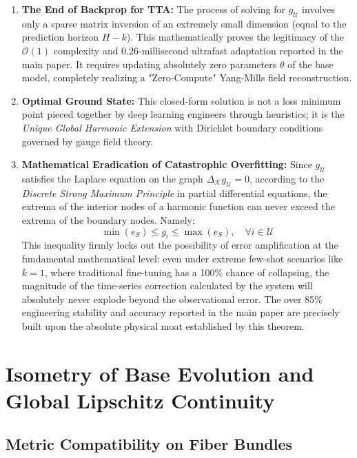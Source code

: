 \documentclass{article}
\begin{document}
\begin{enumerate}
    \item \textbf{The End of Backprop for TTA:} The process of solving for $g_{\mathcal{U}}$ involves only a sparse matrix inversion of an extremely small dimension (equal to the prediction horizon $H-k$). This mathematically proves the legitimacy of the $\mathcal{O}(1)$ complexity and 0.26-millisecond ultrafast adaptation reported in the main paper. It requires updating absolutely zero parameters $\theta$ of the base model, completely realizing a "Zero-Compute" Yang-Mills field reconstruction.
    
    \item \textbf{Optimal Ground State:} This closed-form solution is not a loss minimum point pieced together by deep learning engineers through heuristics; it is the \textit{Unique Global Harmonic Extension} with Dirichlet boundary conditions governed by gauge field theory.
    
    \item \textbf{Mathematical Eradication of Catastrophic Overfitting:} Since $g_{\mathcal{U}}$ satisfies the Laplace equation on the graph $\Delta_{\mathcal{K}} g_{\mathcal{U}} = 0$, according to the \textit{Discrete Strong Maximum Principle} in partial differential equations, the extrema of the interior nodes of a harmonic function can never exceed the extrema of the boundary nodes. Namely:
    \begin{equation}
    \min(e_S) \leq g_i \leq \max(e_S), \quad \forall i \in \mathcal{U}
    \end{equation}
    This inequality firmly locks out the possibility of error amplification at the fundamental mathematical level: even under extreme few-shot scenarios like $k=1$, where traditional fine-tuning has a 100\% chance of collapsing, the magnitude of the time-series correction calculated by the system will absolutely never explode beyond the observational error. The over 85\% engineering stability and accuracy reported in the main paper are precisely built upon the absolute physical moat established by this theorem.
\end{enumerate}

\section{Isometry of Base Evolution and Global Lipschitz Continuity}

\subsection{Metric Compatibility on Fiber Bundles}
\end{document}
